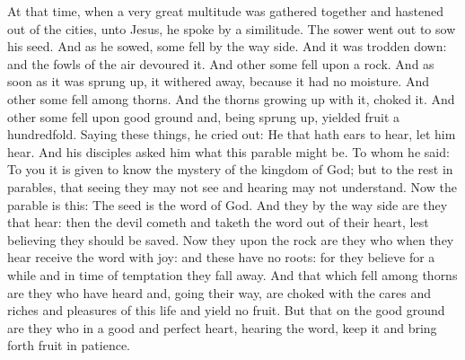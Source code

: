 \begin{multicols}{2}

At that time, when a very great multitude was gathered together and hastened out of the
cities, unto Jesus, he spoke by a similitude.  The sower went out to sow his
seed. And as he sowed, some fell by the way side. And it was trodden down: and
the fowls of the air devoured it.  And other some fell upon a rock. And as soon
as it was sprung up, it withered away, because it had no moisture.  And other
some fell among thorns. And the thorns growing up with it, choked it.  And
other some fell upon good ground and, being sprung up, yielded fruit a
hundredfold. Saying these things, he cried out: He that hath ears to hear, let
him hear.  And his disciples asked him what this parable might be.  To whom he
said: To you it is given to know the mystery of the kingdom of God; but to the
rest in parables, that seeing they may not see and hearing may not understand.
 Now
the parable is this: The seed is the word of God.  And they by the way side are
they that hear: then the devil cometh and taketh the word out of their heart,
lest believing they should be saved.  Now they upon the rock are they who when
they hear receive the word with joy: and these have no roots: for they believe
for a while and in time of temptation they fall away.  And that which fell
among thorns are they who have heard and, going their way, are choked with the
cares and riches and pleasures of this life and yield no fruit.  But that on
the good ground are they who in a good and perfect heart, hearing the word,
keep it and bring forth fruit in patience.



\bigskip




\end{multicols}
